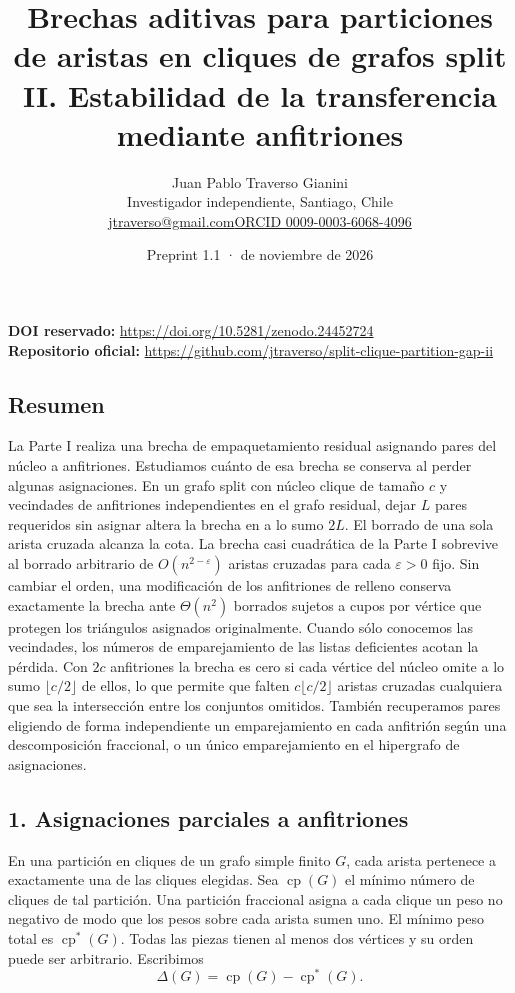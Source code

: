 \documentclass[spanish,11pt,a4paper]{article}
\title{Brechas aditivas para particiones de aristas en cliques de grafos split II. Estabilidad de la transferencia mediante anfitriones}
\author{Juan Pablo Traverso Gianini\\\small Investigador independiente, Santiago, Chile\\\small\href{mailto:jtraverso@gmail.com}{jtraverso@gmail.com}\quad\href{https://orcid.org/0009-0003-6068-4096}{ORCID 0009-0003-6068-4096}}
\date{Preprint 1.1 \enspace · \enspace 23 de noviembre de 2026}
\begin{document}
\raggedbottom\maketitle
\noindent\textbf{DOI reservado:} \url{https://doi.org/10.5281/zenodo.24452724}\\
\textbf{Repositorio oficial:} \url{https://github.com/jtraverso/split-clique-partition-gap-ii}
\subsection{Resumen}\label{resumen}

La Parte I realiza una brecha de empaquetamiento residual asignando pares del núcleo a anfitriones. Estudiamos cuánto de esa brecha se conserva al perder algunas asignaciones. En un grafo split con núcleo clique de tamaño \(c\) y vecindades de anfitriones independientes en el grafo residual, dejar \(L\) pares requeridos sin asignar altera la brecha en a lo sumo \(2L\). El borrado de una sola arista cruzada alcanza la cota. La brecha casi cuadrática de la Parte I sobrevive al borrado arbitrario de \(O(n^{2-\varepsilon})\) aristas cruzadas para cada \(\varepsilon>0\) fijo. Sin cambiar el orden, una modificación de los anfitriones de relleno conserva exactamente la brecha ante \(\Theta(n^2)\) borrados sujetos a cupos por vértice que protegen los triángulos asignados originalmente. Cuando sólo conocemos las vecindades, los números de emparejamiento de las listas deficientes acotan la pérdida. Con \(2c\) anfitriones la brecha es cero si cada vértice del núcleo omite a lo sumo \(\lfloor c/2\rfloor\) de ellos, lo que permite que falten \(c\lfloor c/2\rfloor\) aristas cruzadas cualquiera que sea la intersección entre los conjuntos omitidos. También recuperamos pares eligiendo de forma independiente un emparejamiento en cada anfitrión según una descomposición fraccional, o un único emparejamiento en el hipergrafo de asignaciones.

\subsection{1. Asignaciones parciales a anfitriones}\label{asignaciones-parciales-a-anfitriones}

En una partición en cliques de un grafo simple finito \(G\), cada arista pertenece a exactamente una de las cliques elegidas. Sea \(\operatorname{cp}(G)\) el mínimo número de cliques de tal partición. Una partición fraccional asigna a cada clique un peso no negativo de modo que los pesos sobre cada arista sumen uno. El mínimo peso total es \(\operatorname{cp}^{\ast}(G)\). Todas las piezas tienen al menos dos vértices y su orden puede ser arbitrario. Escribimos
\[
\Delta(G)=\operatorname{cp}(G)-\operatorname{cp}^{\ast}(G).
\]
\end{document}

